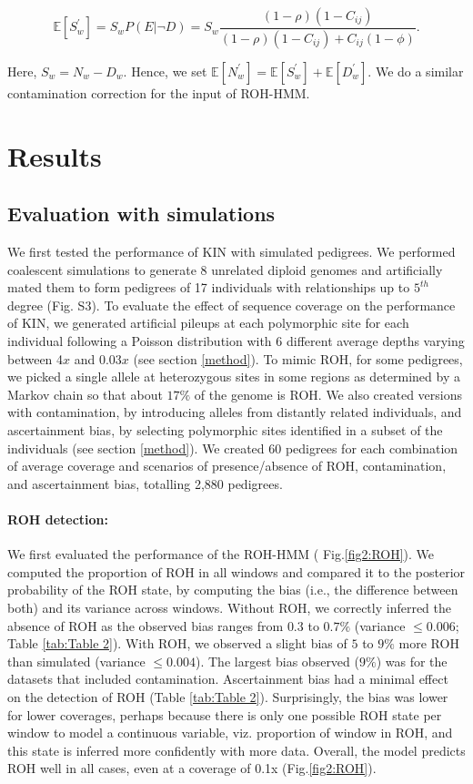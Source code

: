 \documentclass[12pt, letterpaper]{article}
\begin{document}
 \begin{equation}
\mathbb{E}[S_w^{'}] = S_{w} P(E| \neg D) = S_{w} \frac{(1-\rho)(1-C_{ij})}{(1-\rho)(1-C_{ij}) + C_{ij}(1-\phi)}.
 \end{equation}

Here, $S_w = N_w - D_w$. Hence, we set $\mathbb{E}[N_w^{'}] = \mathbb{E}[S_w^{'}] + \mathbb{E}[D_w^{'}]$. We do a similar contamination correction for the input of ROH-HMM.




\section{Results}\label{results}

\subsection{Evaluation with simulations}
We first tested the performance of KIN with simulated pedigrees. We performed coalescent simulations to generate 8 unrelated diploid genomes and artificially mated them to form pedigrees of 17 individuals with relationships up to $5^{th}$ degree (Fig. S3). To evaluate the effect of sequence coverage on the performance of KIN, we generated artificial pileups at each polymorphic site for each individual following a Poisson distribution with 6 different average depths varying between 4$x$ and 0.03$x$ (see section \ref{method}). To mimic ROH, for some pedigrees, we picked a single allele at heterozygous sites in some regions as determined by a Markov chain so that about $17\%$ of the genome is ROH. We also created versions with contamination, by introducing alleles from distantly related individuals, and ascertainment bias, by selecting polymorphic sites identified in a subset of the individuals (see section \ref{method}). We created 60 pedigrees for each combination of average coverage and scenarios of presence/absence of ROH, contamination, and ascertainment bias, totalling 2,880 pedigrees.

\paragraph{ROH detection:}
We first evaluated the performance of the ROH-HMM ( Fig.\ref{fig2:ROH}). We computed the proportion of ROH in all windows and compared it to the posterior probability of the ROH state, by computing the bias (i.e., the difference between both) and its variance across windows. Without ROH, we correctly inferred the absence of ROH as the observed bias ranges from $0.3$ to $0.7\%$ (variance $\leq0.006$; Table \ref{tab:Table 2}). With ROH, we observed a slight bias of $5$ to $9\%$ more ROH than simulated (variance $\leq0.004$). The largest bias observed ($9\%$) was for the datasets that included contamination. Ascertainment bias had a minimal effect on the detection of ROH (Table \ref{tab:Table 2}). Surprisingly, the bias was lower for lower coverages, perhaps because there is only one possible ROH state per window to model a continuous variable, viz. proportion of window in ROH, and this state is inferred more confidently with more data. Overall, the model predicts ROH well in all cases, even at a coverage of 0.1x (Fig.\ref{fig2:ROH}).
\end{document}
